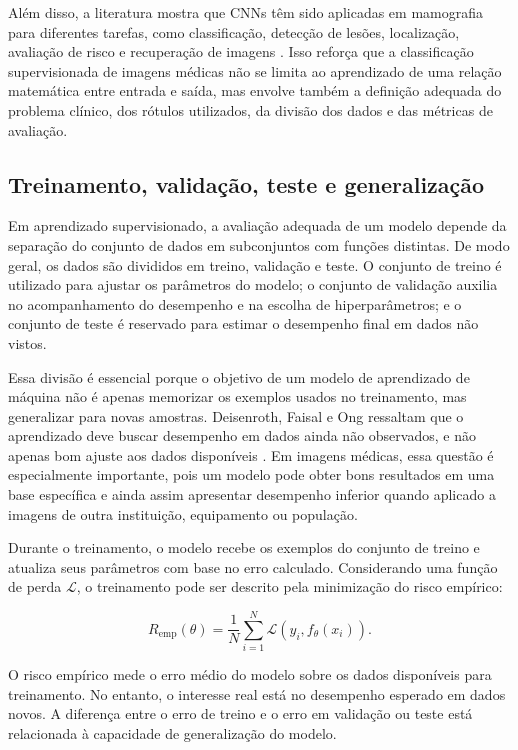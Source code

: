 \documentclass[
    12pt,
    openright,
    oneside,
    a4paper,
    english,
    brazil
]{abntex2}
\begin{document}
Além disso, a literatura mostra que CNNs têm sido aplicadas em mamografia para diferentes tarefas, como classificação, detecção de lesões, localização, avaliação de risco e recuperação de imagens \cite{abdelhafiz2019}. Isso reforça que a classificação supervisionada de imagens médicas não se limita ao aprendizado de uma relação matemática entre entrada e saída, mas envolve também a definição adequada do problema clínico, dos rótulos utilizados, da divisão dos dados e das métricas de avaliação.

\subsection{Treinamento, validação, teste e generalização}
\label{subsec:treinamento_validacao_teste_generalizacao}

Em aprendizado supervisionado, a avaliação adequada de um modelo depende da separação do conjunto de dados em subconjuntos com funções distintas. De modo geral, os dados são divididos em treino, validação e teste. O conjunto de treino é utilizado para ajustar os parâmetros do modelo; o conjunto de validação auxilia no acompanhamento do desempenho e na escolha de hiperparâmetros; e o conjunto de teste é reservado para estimar o desempenho final em dados não vistos.

Essa divisão é essencial porque o objetivo de um modelo de aprendizado de máquina não é apenas memorizar os exemplos usados no treinamento, mas generalizar para novas amostras. Deisenroth, Faisal e Ong ressaltam que o aprendizado deve buscar desempenho em dados ainda não observados, e não apenas bom ajuste aos dados disponíveis \cite{deisenroth2020mathematics}. Em imagens médicas, essa questão é especialmente importante, pois um modelo pode obter bons resultados em uma base específica e ainda assim apresentar desempenho inferior quando aplicado a imagens de outra instituição, equipamento ou população.

Durante o treinamento, o modelo recebe os exemplos do conjunto de treino e atualiza seus parâmetros com base no erro calculado. Considerando uma função de perda \(\mathcal{L}\), o treinamento pode ser descrito pela minimização do risco empírico:

\[
R_{\text{emp}}(\theta)
=
\frac{1}{N}
\sum_{i=1}^{N}
\mathcal{L}(y_i, f_{\theta}(x_i)).
\]

O risco empírico mede o erro médio do modelo sobre os dados disponíveis para treinamento. No entanto, o interesse real está no desempenho esperado em dados novos. A diferença entre o erro de treino e o erro em validação ou teste está relacionada à capacidade de generalização do modelo.
\end{document}

